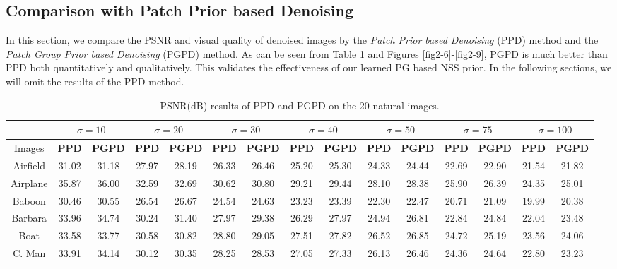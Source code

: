 \subsection{Comparison with Patch Prior based Denoising}
In this section, we compare the PSNR and visual quality of denoised images by the \textsl{Patch Prior based Denoising} (PPD) method and the \textsl{Patch Group Prior based Denoising} (PGPD) method. As can be seen from Table \ref{tab2-1} and Figures \ref{fig2-6}-\ref{fig2-9}, PGPD is much better than PPD both quantitatively and qualitatively. This validates the effectiveness of our learned PG based NSS prior. In the following sections, we will omit the results of the PPD method.
\begin{table}[t!]
\begin{adjustwidth}{-1.5cm}{}
\scriptsize
\caption{PSNR(dB) results of PPD and PGPD on the 20 natural images.}
\label{tab2-1}
\centering
\begin{tabular}{|c||c|c||c|c||c|c||c|c||c|c||c|c||c|c|}
\hline
&\multicolumn{2}{c||}{ $\sigma = 10$}&\multicolumn{2}{c||}{ $\sigma = 20$}&\multicolumn{2}{c||}{ $\sigma = 30$}
&\multicolumn{2}{c||}{ $\sigma = 40$}&\multicolumn{2}{c||}{ $\sigma = 50$}&\multicolumn{2}{c||}{ $\sigma = 75$}
&\multicolumn{2}{c|}{ $\sigma = 100$}
\\
\hline
\hline
Images&\textbf{PPD}&\textbf{PGPD}&\textbf{PPD}&\textbf{PGPD}&\textbf{PPD}&\textbf{PGPD}&\textbf{PPD}&\textbf{PGPD}&\textbf{PPD}
&\textbf{PGPD}&\textbf{PPD}&\textbf{PGPD}&\textbf{PPD}&\textbf{PGPD}
\\
\hline
Airfield&31.02 &31.18  &27.97&28.19  &26.33& 26.46   &25.20 & 25.30  & 24.33 & 24.44  &22.69 &22.90   &21.54&21.82 
\\
\hline
Airplane&35.87 &36.00     &32.59&32.69   &30.62&30.80 &29.21&29.44  &28.10& 28.38    &25.90& 26.39  &24.35 &25.01
\\
\hline
Baboon&30.46&30.55   &26.54&26.67  &24.54 & 24.63 & 23.23&23.39  & 22.30&22.47    &20.71 & 21.09   &19.99 &20.38
\\
\hline 
Barbara&33.96&34.74    &30.24&31.40 & 27.97 & 29.38 & 26.29 & 27.97  &24.94 & 26.81  &22.84 &24.84   &22.04&23.48
\\
\hline
Boat&33.58&33.77     &30.58&30.82    & 28.80 &  29.05  &27.51 & 27.82   & 26.52 &  26.85   & 24.72 &25.19  & 23.56&24.06       
\\
\hline
C. Man&33.91&34.14     &30.12&30.35  & 28.25& 28.53  & 27.05& 27.33  & 26.13 & 26.46  &24.36 &24.64    &22.80 &23.23 
\\

\end{tabular}
\end{adjustwidth}
\end{table}
